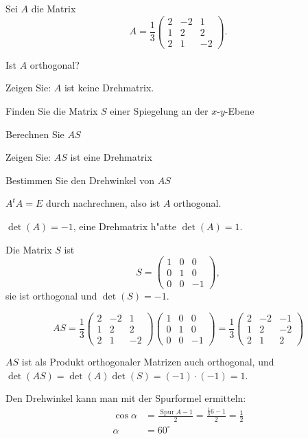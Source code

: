 Sei $A$ die Matrix
\[
A=\frac13\begin{pmatrix}
2&-2& 1\\
1& 2& 2\\
2& 1&-2
\end{pmatrix}.
\]
\begin{teilaufgaben}
\item Ist $A$ orthogonal?
\item Zeigen Sie: $A$ ist keine Drehmatrix.
\item Finden Sie die Matrix $S$ einer Spiegelung an der $x$-$y$-Ebene
\item Berechnen Sie $AS$
\item Zeigen Sie: $AS$ ist eine Drehmatrix
\item Bestimmen Sie den Drehwinkel von $AS$
\end{teilaufgaben}

\begin{loesung}
\begin{teilaufgaben}
\item $A^tA=E$ durch nachrechnen, also ist $A$ orthogonal.
\item $\det(A)=-1$, eine Drehmatrix h"atte $\det(A)=1$.
\item Die Matrix $S$ ist
\[
S=\begin{pmatrix}1&0&0\\0&1&0\\0&0&-1\end{pmatrix},
\]
sie ist orthogonal und $\det(S)=-1$.
\item
\[
AS=\frac13\begin{pmatrix}
2&-2& 1\\
1& 2& 2\\
2& 1&-2
\end{pmatrix}
\begin{pmatrix}1&0&0\\0&1&0\\0&0&-1\end{pmatrix}
=
\frac13\begin{pmatrix}
2&-2&-1\\
1& 2&-2\\
2& 1& 2
\end{pmatrix}
\]
\item $AS$ ist als Produkt orthogonaler Matrizen auch orthogonal,
und $\det(AS)=\det(A)\det(S)=(-1)\cdot(-1)=1$.
\item Den Drehwinkel kann man mit der Spurformel ermitteln:
\begin{align*}
\cos\alpha&= \frac{\operatorname{Spur} A -1}2=\frac{\frac136-1}2=\frac12
\\
\alpha&=60^\circ
\end{align*}
\end{teilaufgaben}
\end{loesung}

